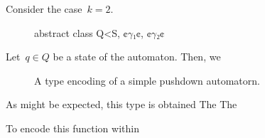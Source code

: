Consider the case~$k=2$.
\begin{figure}
\begin{JAVA}
abstract class Q<S, ¢$γ₁$¢, ¢$γ₂$¢
\end{JAVA}
\end{figure}

Let~$q∈Q$ be a state of the automaton. Then, we

\begin{figure}
  \caption{\label{Figure:BNF:example}%
    A type encoding of a simple pushdown automatorn.
  }
\end{figure}
  As might be expected, this type is obtained
  The
  The

To encode this function within
